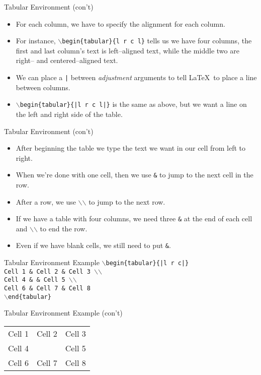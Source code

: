 \documentclass[pdf]{prosper}
\begin{document}
\begin{slide}{Tabular Environment (con't)}
	\begin{itemize}
		\item For each column, we have to specify the alignment for each column.
		\item For instance, \texttt{$\backslash$begin\{tabular\}\{l r c l\}} tells us we have four columns, the first and last column's text is left--aligned text, while the middle two are right-- and centered--aligned text.
		\item We can place a \texttt{|} between \textit{adjustment} arguments to tell \LaTeX\ to place a line between columns.
		\item \texttt{$\backslash$begin\{tabular\}\{|l r c l|\}} is the same as above, but we want a line on the left and right side of the table.
	\end{itemize}
\end{slide}
\begin{slide}{Tabular Environment (con't)}
	\begin{itemize}
		\item After beginning the table we type the text we want in our cell from left to right.
		\item When we're done with one cell, then we use \texttt{\&} to jump to the next cell in the row.
		\item After a row, we use \texttt{$\backslash$$\backslash$} to jump to the next row.
		\item If we have a table with four columns, we need three \texttt{\&} at the end of each cell and \texttt{$\backslash$$\backslash$} to end the row.
		\item Even if we have blank cells, we still need to put \texttt{\&}.
	\end{itemize}
\end{slide}
\begin{slide}{Tabular Environment Example}
	\texttt{$\backslash$begin\{tabular\}\{|l r c|\}} \\
	\texttt{Cell 1 \& Cell 2 \& Cell 3 $\backslash$$\backslash$} \\
	\texttt{Cell 4 \& \& Cell 5 $\backslash$$\backslash$} \\
	\texttt{Cell 6 \& Cell 7 \& Cell 8} \\
	\texttt{$\backslash$end\{tabular\}}
\end{slide}
\begin{slide}{Tabular Environment Example (con't)}
	\begin{tabular}{|l r c|}
	Cell 1 & Cell 2 & Cell 3 \\
	Cell 4 & & Cell 5 \\
	Cell 6 & Cell 7 & Cell 8
	\end{tabular}
\end{slide}
\end{document}
